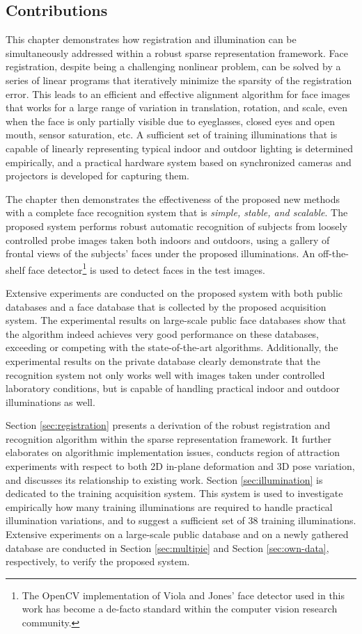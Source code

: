 \subsection{Contributions} This chapter demonstrates how registration and
illumination can be simultaneously addressed within a robust sparse
representation framework. Face registration, despite being a challenging
nonlinear problem, can be solved by a series of linear programs that
iteratively minimize the sparsity of the registration error. This leads to an
efficient and effective alignment algorithm for face images that works for a
large range of variation in translation, rotation, and scale, even when the
face is only partially visible due to eyeglasses, closed eyes and open mouth,
sensor saturation, etc.  A sufficient set of training illuminations that is
capable of linearly representing typical indoor and outdoor lighting is
determined empirically, and a practical hardware system based on synchronized
cameras and projectors is developed for capturing them.

The chapter then demonstrates the effectiveness of the proposed new
methods with a complete face recognition system that is {\em
simple, stable, and scalable}. The proposed system performs
robust automatic recognition of subjects from loosely
controlled probe images taken both indoors and outdoors,
using a gallery of
frontal views of the subjects' faces under the proposed
illuminations. An off-the-shelf face
detector\footnote{The OpenCV
implementation of Viola and Jones' face detector
\cite{Viola2004-IJCV} used in this work has become a de-facto standard
within the computer vision research community.} is used to detect faces in the test images.

Extensive experiments are conducted on the proposed system with
both public databases and a face database that is collected by
the proposed acquisition system. The experimental results on
large-scale public face databases show that the algorithm
indeed achieves very good performance on these databases,
exceeding or competing with the state-of-the-art algorithms.
Additionally, the experimental results on the private database
clearly demonstrate that the recognition system not only works well with
images taken under controlled laboratory conditions, but is
capable of handling practical indoor and outdoor illuminations as well.

 Section \ref{sec:registration}
presents a derivation of the robust registration and recognition algorithm within the sparse
representation framework. It further elaborates on algorithmic implementation issues,
conducts region of attraction experiments with respect to both 2D in-plane
deformation and 3D pose variation, and discusses its relationship to existing
work. Section \ref{sec:illumination} is dedicated to the training acquisition
system. This system is used to investigate empirically how many training
illuminations are required to handle practical illumination variations, and to
suggest a sufficient set of 38 training illuminations. Extensive experiments on
a large-scale public database and on a newly gathered database are conducted in Section
\ref{sec:multipie} and Section \ref{sec:own-data}, respectively, to verify the
proposed system. 

